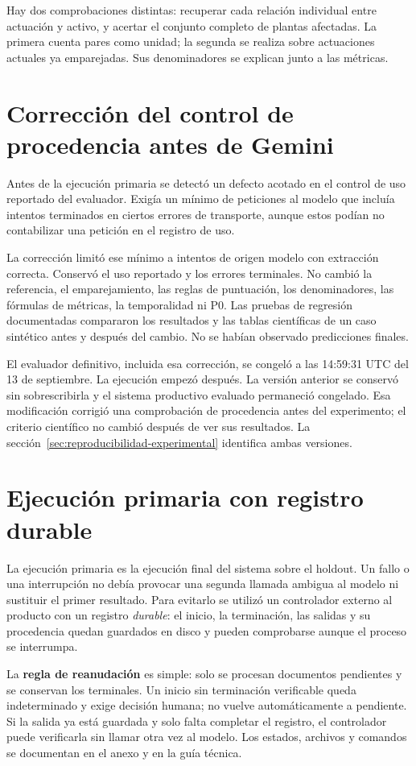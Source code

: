 Hay dos comprobaciones distintas: recuperar cada relación individual entre
actuación y activo, y acertar el conjunto completo de plantas afectadas.
La primera cuenta pares como unidad; la segunda se realiza sobre actuaciones
actuales ya emparejadas. Sus denominadores se explican junto a las métricas.

\section{Corrección del control de procedencia antes de Gemini}
Antes de la ejecución primaria se detectó un defecto acotado en el control
de uso reportado del evaluador. Exigía un mínimo de peticiones al modelo
que incluía intentos terminados en ciertos errores de transporte, aunque
estos podían no contabilizar una petición en el registro de uso.

La corrección limitó ese mínimo a intentos de origen modelo con extracción
correcta. Conservó el uso reportado y los errores terminales. No cambió
la referencia, el emparejamiento, las reglas de puntuación, los
denominadores, las fórmulas de métricas, la temporalidad ni P0. Las pruebas
de regresión documentadas compararon los resultados y las tablas científicas
de un caso sintético antes y después del cambio.
No se habían observado predicciones finales.

El evaluador definitivo, incluida esa corrección, se congeló a las
14:59:31 UTC del 13 de septiembre. La ejecución empezó después. La versión
anterior se conservó sin sobrescribirla y el sistema productivo evaluado
permaneció congelado. Esa modificación corrigió una comprobación de
procedencia antes del experimento; el criterio científico no cambió después
de ver sus resultados.
La sección~\ref{sec:reproducibilidad-experimental} identifica ambas versiones.

\section{Ejecución primaria con registro durable}
\label{sec:ejecucion-primaria}
La ejecución primaria es la ejecución final del sistema sobre el holdout.
Un fallo o una interrupción no debía provocar una segunda llamada ambigua
al modelo ni sustituir el primer resultado. Para evitarlo se utilizó un
controlador externo al producto con un registro \emph{durable}: el inicio,
la terminación, las salidas y su procedencia quedan guardados en disco y
pueden comprobarse aunque el proceso se interrumpa.

La \textbf{regla de reanudación} es simple: solo se procesan documentos
pendientes y se conservan los terminales. Un inicio sin terminación verificable
queda indeterminado y exige decisión humana; no vuelve automáticamente a
pendiente. Si la salida ya está guardada y solo falta completar el registro,
el controlador puede verificarla sin llamar otra vez al modelo. Los estados,
archivos y comandos se documentan en el anexo y en la guía técnica.


